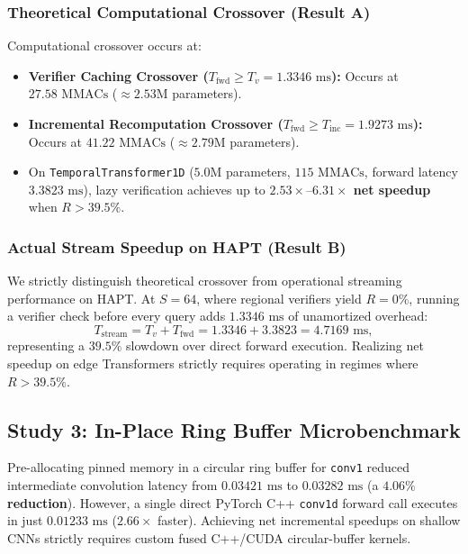 \documentclass[journal,onecolumn,10pt]{IEEEtran}
\newcommand{\code}[1]{{\small\ttfamily\nolinkurl{#1}}}
\theoremstyle{remark}
\begin{document}
\subsubsection{Theoretical Computational Crossover (Result A)}
Computational crossover occurs at:
\begin{itemize}[leftmargin=1.4em]
  \item \textbf{Verifier Caching Crossover ($T_{\text{fwd}} \ge T_v = 1.3346\text{ ms}$):} Occurs at \textbf{$27.58\text{ MMACs}$} ($\approx 2.53\text{M}$ parameters).
  \item \textbf{Incremental Recomputation Crossover ($T_{\text{fwd}} \ge T_{\text{inc}} = 1.9273\text{ ms}$):} Occurs at \textbf{$41.22\text{ MMACs}$} ($\approx 2.79\text{M}$ parameters).
  \item On \code{TemporalTransformer1D} ($5.0\text{M}$ parameters, $115\text{ MMACs}$, forward latency $3.3823\text{ ms}$), lazy verification achieves up to \textbf{$2.53\times\text{--}6.31\times$ net speedup} when $R > 39.5\%$.
\end{itemize}

\subsubsection{Actual Stream Speedup on HAPT (Result B)}
We strictly distinguish theoretical crossover from operational streaming performance on HAPT. At $S=64$, where regional verifiers yield $R = 0\%$, running a verifier check before every query adds $1.3346\text{ ms}$ of unamortized overhead:
\begin{equation}
T_{\text{stream}} = T_v + T_{\text{fwd}} = 1.3346 + 3.3823 = 4.7169\text{ ms},
\end{equation}
representing a $39.5\%$ slowdown over direct forward execution. Realizing net speedup on edge Transformers strictly requires operating in regimes where $R > 39.5\%$.

\subsection{Study 3: In-Place Ring Buffer Microbenchmark}
Pre-allocating pinned memory in a circular ring buffer for \code{conv1} reduced intermediate convolution latency from $0.03421\text{ ms}$ to $0.03282\text{ ms}$ (a \textbf{$4.06\%$ reduction}). However, a single direct PyTorch C++ \code{conv1d} forward call executes in just \textbf{$0.01233\text{ ms}$} ($2.66\times$ faster). Achieving net incremental speedups on shallow CNNs strictly requires custom fused C++/CUDA circular-buffer kernels.
\end{document}
